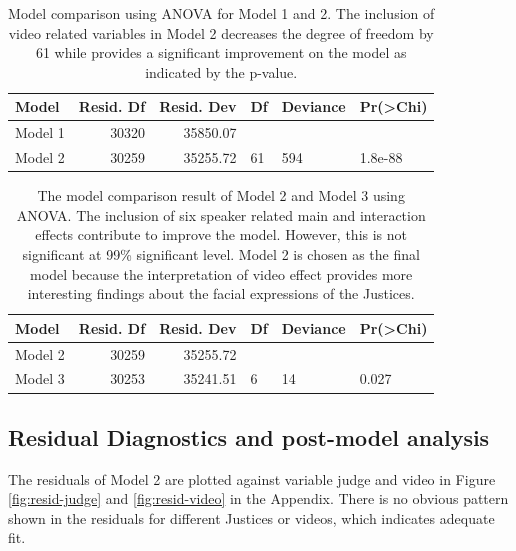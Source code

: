 \documentclass{monashthesis}
\begin{document}
\begin{table}[ht]
\begin{center}
\caption{\label{tab:anova-1}Model comparison using ANOVA for Model 1 and 2. The inclusion of video related variables in Model 2 decreases the degree of freedom by 61 while provides a significant improvement on the model as indicated by the p-value. }
\begin{tabular}{lrrlll}
\toprule
Model & Resid. Df & Resid. Dev & Df & Deviance & Pr(>Chi) \\
\midrule
Model 1 & 30320 & 35850.07 &   &   &   \\
Model 2 & 30259 & 35255.72 & 61 & 594 & 1.8e-88 \\
\bottomrule
\end{tabular}
\end{center}
\end{table}

\begin{table}[ht]
\begin{center}
\caption{\label{tab:anova-2}The model comparison result of Model 2 and Model 3 using ANOVA. The inclusion of six speaker related main and interaction effects contribute to improve the model. However, this is not significant at 99\% significant level. Model 2 is chosen as the final model because the interpretation of video effect provides more interesting findings about the facial expressions of the Justices. }
\begin{tabular}{lrrlll}
\toprule
Model & Resid. Df & Resid. Dev & Df & Deviance & Pr(>Chi) \\
\midrule
Model 2 & 30259 & 35255.72 &   &   &   \\
Model 3 & 30253 & 35241.51 & 6 & 14 & 0.027 \\
\bottomrule
\end{tabular}
\end{center}
\end{table}

\hypertarget{residual-diagnostics-and-post-model-analysis}{%
\subsection{Residual Diagnostics and post-model analysis}\label{residual-diagnostics-and-post-model-analysis}}

The residuals of Model 2 are plotted against variable judge and video in Figure \ref{fig:resid-judge} and \ref{fig:resid-video} in the Appendix. There is no obvious pattern shown in the residuals for different Justices or videos, which indicates adequate fit.
\end{document}
